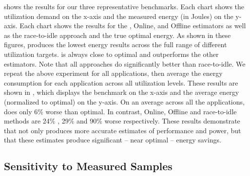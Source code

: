  shows the results for our three representative
benchmarks.  Each chart shows the utilization demand on the x-axis and
the measured energy (in Joules) on the y-axis.  Each chart shows the
results for the \SYSTEM{}, Online, and Offline estimators as well as
the race-to-idle approach and the true optimal energy.  As shown in
these figures, \SYSTEM{} produces the lowest energy results across the
full range of different utilization targets.  \SYSTEM{} is always
close to optimal and outperforms the other estimators.  Note that all
approaches do significantly better than race-to-idle. We repeat the
above experiment for all applications, then average the energy
consumption for each application across all utilization levels.  These
results are shown in , which displays the
benchmark on the x-axis and the average energy (normalized to optimal)
on the y-axis.  On an average across all the applications, \SYSTEM{}
does only 6\% worse than optimal.  In contrast, Online, Offline and
race-to-idle methods are 24\% , 29\% and 90\% worse respectively.
These results demonstrate that \SYSTEM{} not only produces more
accurate estimates of performance and power, but that these estimates
produce significant -- near optimal -- energy savings.

\subsection{Sensitivity to Measured Samples}

